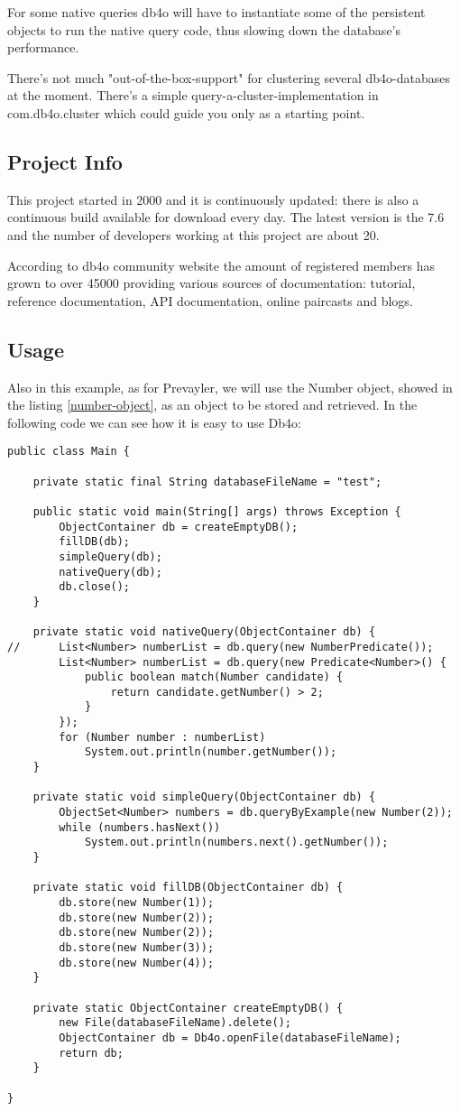 For some native queries db4o will have to instantiate some of the persistent objects to run the native query code, thus slowing down the database's performance. 

There's not much "out-of-the-box-support" for clustering several db4o-databases at the moment. There's a simple query-a-cluster-implementation in com.db4o.cluster which could guide you only as a starting point.
			
			\subsection{Project Info}
This project started in 2000 and it is continuously updated: there is also a continuous build available for download every day. The latest version is the 7.6 and the number of developers working at this project are about 20.

According to db4o community website the amount of registered members has grown to over 45000 providing various sources of documentation: tutorial, reference documentation, API documentation, online paircasts and blogs.

			\subsection{Usage}


Also in this example, as for Prevayler, we will use the Number object, showed in the listing \ref{number-object}, as an object to be stored and retrieved. In the following code we can see how it is easy to use Db4o:

\begin{lstlisting}
public class Main {

	private static final String databaseFileName = "test";

	public static void main(String[] args) throws Exception {
		ObjectContainer db = createEmptyDB();
		fillDB(db);
		simpleQuery(db);
		nativeQuery(db);
		db.close();
	}

	private static void nativeQuery(ObjectContainer db) {
//		List<Number> numberList = db.query(new NumberPredicate());
		List<Number> numberList = db.query(new Predicate<Number>() {
			public boolean match(Number candidate) {
				return candidate.getNumber() > 2;
			}
		});
		for (Number number : numberList)
			System.out.println(number.getNumber());
	}

	private static void simpleQuery(ObjectContainer db) {
		ObjectSet<Number> numbers = db.queryByExample(new Number(2));
		while (numbers.hasNext())
			System.out.println(numbers.next().getNumber());
	}

	private static void fillDB(ObjectContainer db) {
		db.store(new Number(1));
		db.store(new Number(2));
		db.store(new Number(2));
		db.store(new Number(3));
		db.store(new Number(4));
	}

	private static ObjectContainer createEmptyDB() {
		new File(databaseFileName).delete();
		ObjectContainer db = Db4o.openFile(databaseFileName);
		return db;
	}

}

\end{lstlisting}
			
